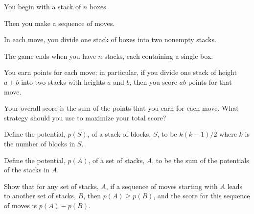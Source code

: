 \documentclass[14pt]{extarticle}
\begin{document}
You begin with a stack of $n$ boxes. 

Then you make a sequence of moves. 

In each move, you divide one stack of boxes into two nonempty stacks. 

The game ends when you have $n$ stacks, each containing a single box.

You earn points for each move; in particular, if you divide one stack of height $a + b$ into two stacks with heights $a$ and $b$, then you score $ab$ points for that move.

Your overall score is the sum of the points that you earn for each move. What strategy should you use to maximize your total score?

Define the potential, $p(S)$, of a stack of blocks, $S$, to be $k(k - 1)/2$ where $k$ is the number of blocks in $S$. 

Define the potential, $p(A)$, of a set of stacks, $A$, to be the sum of the potentials of the stacks in $A$.

Show that for any set of stacks, $A$, if a sequence of moves starting with $A$ leads to another set of stacks, $B$, then $p(A) \geq p(B)$, and the score for this sequence of moves is $p(A) - p(B)$.
\end{document}
